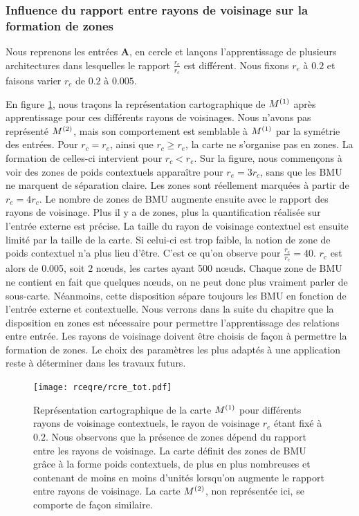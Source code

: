 \documentclass[../main]{subfiles}
\begin{document}
\subsubsection{Influence du rapport entre rayons de voisinage sur la formation de zones}

Nous reprenons les entrées \textbf{A}, en cercle et lançons l'apprentissage de plusieurs architectures dans lesquelles le rapport $\frac{r_e}{r_c}$ est différent.
Nous fixons $r_e$ à $0.2$ et faisons varier $r_c$ de $0.2$ à $0.005$.

En figure \ref{fig:rcre}, nous traçons la représentation cartographique de $M^{({1})}$ après apprentissage pour ces différents rayons de voisinages.  Nous n'avons pas représenté $M^{({2})}$, mais son comportement est semblable à $M^{({1})}$ par la symétrie des entrées.
Pour $r_c = r_e$, ainsi que $r_c \geq r_e$, la carte ne s'organise pas en zones. 
La formation de celles-ci intervient pour $r_c < r_e$. Sur la figure, nous commençons à voir des zones de poids contextuels apparaître pour $r_e = 3r_c$, sans que les BMU ne marquent de séparation claire. Les zones sont réellement marquées à partir de $r_e = 4r_c$.
Le nombre de zones de BMU augmente ensuite avec le rapport des rayons de voisinage. Plus il y a de zones, plus la quantification réalisée sur l'entrée externe est précise.
La taille du rayon de voisinage contextuel est ensuite limité par la taille de la carte. Si celui-ci est trop faible, la notion de zone de poids contextuel n'a plus lieu d'être. C'est ce qu'on observe pour $\frac{r_e}{r_c} = 40$. $r_c$ est alors de 0.005, soit $2$ n\oe{}uds, les cartes ayant 500 n\oe{}uds. 
Chaque zone de BMU ne contient en fait que quelques n\oe{}uds, on ne peut donc plus vraiment parler de sous-carte. Néanmoins, cette disposition sépare toujours les BMU en fonction de l'entrée externe et contextuelle. 
Nous verrons dans la suite du chapitre que la disposition en zones est nécessaire pour permettre l'apprentissage des relations entre entrée. Les rayons de voisinage doivent être choisis de façon à permettre la formation de zones. 
Le choix des paramètres les plus adaptés à une application reste à déterminer dans les travaux futurs.

\begin{figure}[ht]
	\texttt{[image: rceqre/rcre\_tot.pdf]}
	\caption{Représentation cartographique de la carte $M^{({1})}$ pour différents rayons de voisinage contextuels, le rayon de voisinage $r_e$ étant fixé à $0.2$. Nous observons que la présence de zones dépend du rapport entre les rayons de voisinage. La carte définit des zones de BMU grâce à la forme poids contextuels, de plus en plus nombreuses et contenant de moins en moins d'unités lorsqu'on augmente le rapport entre rayons de voisinage.
	La carte $M^{({2})}$, non représentée ici, se comporte de façon similaire.\label{fig:rcre}
	}
\end{figure}	
\end{document}
